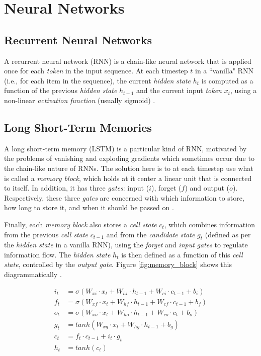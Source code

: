 \section{Neural Networks}
\label{sec:neural_networks}

\subsection{Recurrent Neural Networks}

A recurrent neural network (RNN) is a chain-like neural network that is applied once for each \textit{token} in the input sequence. At each timestep $t$ in a ``vanilla" RNN (i.e., for each item in the sequence), the current \textit{hidden state} $h_t$ is computed as a function of the previous \textit{hidden state} $h_{t-1}$ and the current input \textit{token} $x_t$, using a non-linear \textit{activation function} (usually sigmoid) \cite{cho_learning_2014}.

\subsection{Long Short-Term Memories}

A long short-term memory (LSTM) is a particular kind of RNN, motivated by the problems of vanishing and exploding gradients which sometimes occur due to the chain-like nature of RNNs. The solution here is to at each timestep use what is called a \textit{memory block}, which holds at it center a linear unit that is connected to itself. In addition, it has three \textit{gates}: input ($i$), forget ($f$) and output ($o$). Respectively, these three \textit{gates} are concerned with which information to store, how long to store it, and when it should be passed on \cite{gers_learning_2000}.

Finally, each \textit{memory block} also stores a \textit{cell state} $c_t$, which combines information from the previous \textit{cell state} $c_{t-1}$ and from the \textit{candidate state} $g_t$ (defined as per the \textit{hidden state} in a vanilla RNN), using the \textit{forget} and \textit{input} \textit{gates} to regulate information flow. The \textit{hidden state} $h_t$ is then defined as a function of this \textit{cell state}, controlled by the \textit{output gate}. Figure \ref{fig:memory_block} shows this diagrammatically \cite{graves_hybrid_2013}.

\begin{equation}
\begin{aligned}
i_t &= \sigma(W_{xi} \cdot x_t + W_{hi} \cdot h_{t-1} + W_{ci} \cdot c_{t-1} + b_i) \\
f_t &= \sigma(W_{xf} \cdot x_t + W_{hf} \cdot h_{t-1} + W_{cf} \cdot c_{t-1} + b_f) \\
o_t &= \sigma(W_{xo} \cdot x_t + W_{ho} \cdot h_{t-1} + W_{co} \cdot c_t + b_o) \\
g_t &= tanh(W_{xg} \cdot x_t + W_{hg} \cdot h_{t-1} + b_g) \\
c_t &= f_t \cdot c_{t-1} + i_t \cdot g_t \\
h_t &= tanh(c_t)
\end{aligned}
\end{equation}

